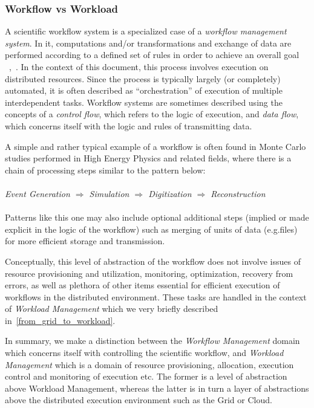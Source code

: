 \subsubsection{Workflow vs Workload}
\label{workflow_workload}
A scientific workflow system is a specialized case of a \textit{workflow management system}. In it, computations and/or transformations and exchange of data are performed according to a defined set of rules
in order to achieve an overall goal ~\cite{grid_workflow_taxonomy},~\cite{grid_workflow_fit}. In the context of this document, this process involves execution on distributed resources. Since the process is
typically largely (or completely) automated, it is often described as ``orchestration'' of execution of multiple interdependent tasks. Workflow systems are sometimes described using the concepts of a \textit{control flow},
which refers to the logic of execution, and \textit{data flow}, which concerns itself with the logic and rules of transmitting data.

A simple and rather typical example of a workflow is often found in Monte Carlo studies performed in High Energy Physics and related fields, where there is a chain of processing steps similar to the pattern below:
\\
\\
\textit{Event  Generation $\Longrightarrow$ Simulation $\Longrightarrow$ Digitization $\Longrightarrow$ Reconstruction}
\\
\\
Patterns like this one may also include optional additional steps (implied or made explicit in the logic of the workflow) such as merging of units of data (e.g.files) for more efficient storage and transmission.

Conceptually, this level of abstraction of the workflow does not  involve issues of resource provisioning and utilization, monitoring, optimization, recovery from errors, as well as plethora of other items essential
for efficient execution of workflows in the distributed environment. These tasks are handled in the context of \textit{Workload Management} which we very briefly described in~\ref{from_grid_to_workload}.

In summary, we make a distinction between the \textit{Workflow Management} domain which concerns itself with controlling the scientific workflow, and \textit{Workload Management} which
is a domain of resource provisioning, allocation, execution control and monitoring of execution etc. The former is a level of abstraction above Workload Management, whereas the latter is in
turn a layer of abstractions above the distributed execution environment such as the Grid or Cloud.

